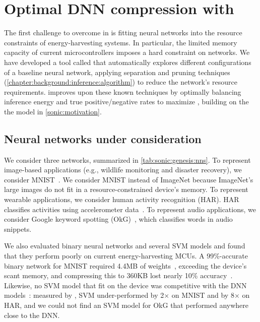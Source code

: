 \section{Optimal DNN compression with \genesis}
\label{sonic:genesis}

The first challenge to overcome in \sonictails is fitting neural networks into the
resource constraints of energy-harvesting systems.
%
In particular, the limited memory capacity of current microcontrollers
imposes a hard constraint on networks.
%
We have developed a tool called \genesis
that automatically
explores different configurations of a baseline neural network,
applying separation and pruning techniques (\autoref{chapter:background:inference:algorithm}) to reduce the network's resource requirements.
%
\genesis improves upon these known techniques by
optimally balancing inference energy and true positive/negative rates to maximize \metric,
building on the the model in \autoref{sonic:motivation}.

\tabSONICleGenesisNNS

\subsection{Neural networks under consideration}
We consider three networks, summarized in \autoref{tab:sonic:genesis:nns}.
%
To represent image-based applications (e.g., wildlife monitoring and
disaster recovery), we consider MNIST~\cite{lecun1998mnist}. We consider
MNIST instead of ImageNet because ImageNet's large images 
do not fit in a resource-constrained device's memory.
%
To represent wearable applications, we consider human activity recognition
(HAR). HAR classifies activities using accelerometer data~\cite{har}.
%
To represent audio applications, we consider Google keyword
spotting (OkG)~\cite{okgoogle}, which classifies words in audio snippets.

We also evaluated binary neural networks and several SVM models
and found that they perform poorly on current energy-harvesting MCUs.
%
A 99\%-accurate binary network for MNIST required 4.4MB of weights~\cite{courbariaux2016binarized},
exceeding the device's scant memory, and compressing this to 360KB lost nearly 10\% accuracy~\cite{binarynetgithub}.
%
Likewise, no SVM model that fit on the device was competitive with 
the DNN models~\cite{lecun1998gradient}: measured by \metric, SVM under-performed 
by 2$\times$ on MNIST and by 8$\times$ on HAR, and we could not find an SVM model 
for OkG that performed anywhere close to the DNN.

